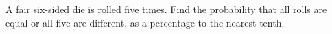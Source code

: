 A fair six-sided die is rolled five times. Find the probability that all rolls are equal or all five are different, as a percentage to the nearest tenth.

